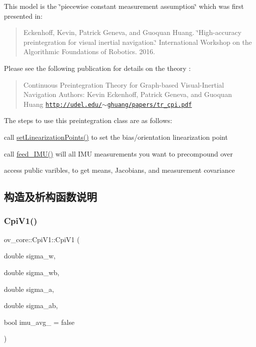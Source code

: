 This model is the \char`\"{}piecewise constant measurement assumption\char`\"{} which was first presented in\+: \begin{quote}
Eckenhoff, Kevin, Patrick Geneva, and Guoquan Huang. \char`\"{}\+High-\/accuracy preintegration for visual inertial navigation.\char`\"{} International Workshop on the Algorithmic Foundations of Robotics. 2016. \end{quote}
Please see the following publication for details on the theory \cite{Eckenhoff2019IJRR} \+: \begin{quote}
Continuous Preintegration Theory for Graph-\/based Visual-\/\+Inertial Navigation Authors\+: Kevin Eckenhoff, Patrick Geneva, and Guoquan Huang \href{http://udel.edu/~ghuang/papers/tr_cpi.pdf}{\tt http\+://udel.\+edu/$\sim$ghuang/papers/tr\+\_\+cpi.\+pdf} \end{quote}


The steps to use this preintegration class are as follows\+:
\begin{DoxyEnumerate}
\item call \hyperlink{classov__core_1_1CpiBase_a32c11e3e61dc8a524bf48a18504b5417}{set\+Linearization\+Points()} to set the bias/orientation linearization point
\item call \hyperlink{classov__core_1_1CpiV1_aafd93ac727dc176a9d5ca4b6d09d0cd2}{feed\+\_\+\+I\+M\+U()} will all I\+MU measurements you want to precompound over
\item access public varibles, to get means, Jacobians, and measurement covariance 
\end{DoxyEnumerate}

\subsection{构造及析构函数说明}
\mbox{\label{classov__core_1_1CpiV1_a34e803dec05d4a2e009ed170175d19d7}} 
\subsubsection{\texorpdfstring{Cpi\+V1()}{CpiV1()}}
{\footnotesize\ttfamily ov\+\_\+core\+::\+Cpi\+V1\+::\+Cpi\+V1 (\begin{DoxyParamCaption}\item[{double}]{sigma\+\_\+w,  }\item[{double}]{sigma\+\_\+wb,  }\item[{double}]{sigma\+\_\+a,  }\item[{double}]{sigma\+\_\+ab,  }\item[{bool}]{imu\+\_\+avg\+\_\+ = {\ttfamily false} }\end{DoxyParamCaption})\hspace{0.3cm}{\ttfamily [inline]}}



